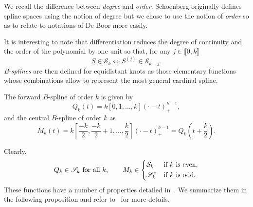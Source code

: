 \begin{remark}
  We recall the difference between \emph{degree} and \emph{order}. Schoenberg originally defines spline spaces using the 
  notion of degree but we chose to use the notion of \emph{order} so as to relate to notations of De Boor more easily.
\end{remark}

It is interesting to note that differentiation reduces the degree of continuity and the order of the polynomial by one 
unit so that, for any $j \in \llbracket0, k\rrbracket$ 
\begin{equation}
  \label{eq:sk-sr}
  S \in \mathscr{S}_k \iff S^{(j)} \in \mathcal{S}_{k-j}.
\end{equation}
\emph{B-splines} are then defined for equidistant knots as those elementary functions whose combinations allow to 
represent the most general cardinal spline.  
\begin{deftn}
  The forward $B$-spline of order $k$ is given by
  \begin{equation}
    \label{eq:fbspline}
    Q_k(t) = k[0, 1, \ldots, k]{(\cdot-t)}_{+}^{k-1},
  \end{equation}
  and the central $B$-spline of order $k$ as
  \begin{equation}
    \label{eq:cbspline}
    M_k(t) = k\left[\frac{-k}{2}, \frac{-k}{2}+1, \ldots, \frac{k}{2}\right]{(\cdot-t)}_{+}^{k-1} = Q_k(t+\frac{k}{2}).
  \end{equation}
\end{deftn}
Clearly, 
\begin{equation*}
  Q_k \in \mathscr{S}_k \ \text{for all} \ k, \qquad M_k \in \begin{dcases} \mathcal{S}_k & \text{if $k$ is even}, \\ 
  \mathscr{S}_k^* & \text{if $k$ is odd}. \end{dcases}
\end{equation*}
These functions have a number of properties detailed in~\cite[Lectures 1 and 2]{schoenberg_cardinal_1973-1}. We 
summarize them in the following proposition and refer to~\cite{schoenberg_cardinal_1973-1} for more details.
